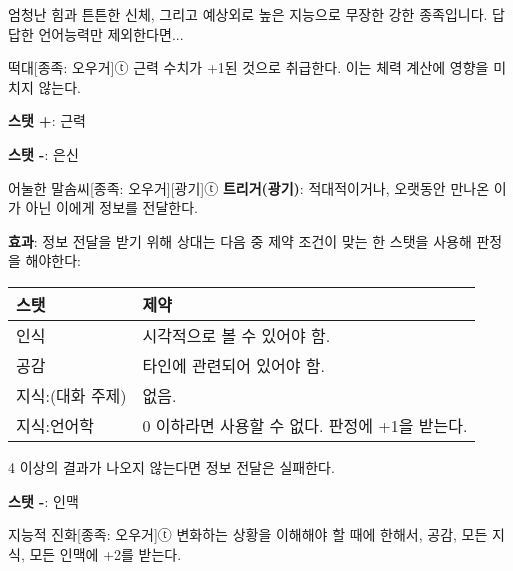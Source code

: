 \documentclass{report}
\begin{document}
	엄청난 힘과 튼튼한 신체, 그리고 예상외로 높은 지능으로 무장한 강한 종족입니다. 답답한 언어능력만 제외한다면...
	
	\begin{story}{떡대}{[종족: 오우거]ⓣ}
		근력 수치가 +1된 것으로 취급한다. 이는 체력 계산에 영향을 미치지 않는다.
		
		\textbf{스탯 +}: 근력
		
		\textbf{스탯 -}: 은신
		
	\end{story}
	
	\begin{story}{어눌한 말솜씨}{[종족: 오우거][광기]ⓣ}
		\textbf{트리거(광기)}: 적대적이거나, 오랫동안 만나온 이가 아닌 이에게 정보를 전달한다.
		
		\textbf{효과}: 정보 전달을 받기 위해 상대는 다음 중 제약 조건이 맞는 한 스탯을 사용해 판정을 해야한다:
		
		\begin{center}
		\begin{tabular}{l|l}
			\textbf{스탯}    & \textbf{제약}                                  \\\hline\hline
			인식             & 시각적으로 볼 수 있어야 함.                    \\\hline
			공감             & 타인에 관련되어 있어야 함.                     \\\hline
			지식:(대화 주제) & 없음.                                          \\\hline
			지식:언어학      & 0 이하라면 사용할 수 없다. 판정에 +1을 받는다.
		\end{tabular}
		\end{center}
		
		4 이상의 결과가 나오지 않는다면 정보 전달은 실패한다.
		
		\textbf{스탯 -}: 인맥
		
	\end{story}
	
	\begin{story}{지능적 진화}{[종족: 오우거]ⓣ}
		변화하는 상황을 이해해야 할 때에 한해서, 공감, 모든 지식, 모든 인맥에 +2를 받는다.
		
	\end{story}
\end{document}
